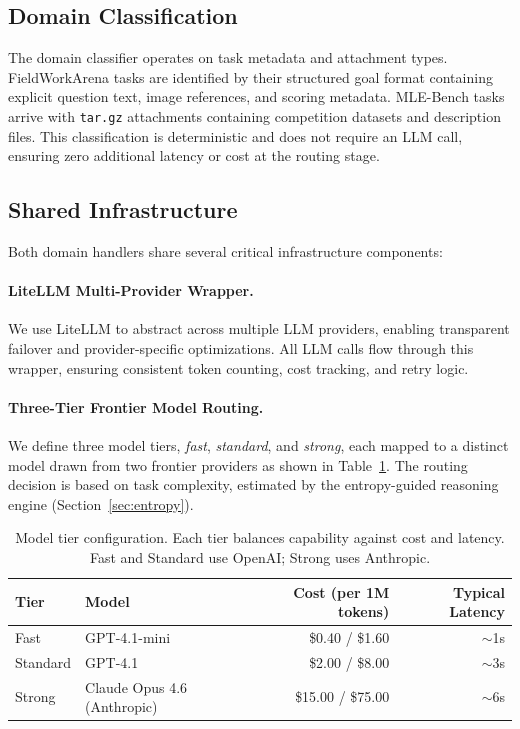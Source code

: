 \documentclass[11pt]{article}
\begin{document}
\subsection{Domain Classification}

The domain classifier operates on task metadata and attachment types. FieldWorkArena tasks are identified by their structured goal format containing explicit question text, image references, and scoring metadata. MLE-Bench tasks arrive with \texttt{tar.gz} attachments containing competition datasets and description files. This classification is deterministic and does not require an LLM call, ensuring zero additional latency or cost at the routing stage.

\subsection{Shared Infrastructure}

Both domain handlers share several critical infrastructure components:

\paragraph{LiteLLM Multi-Provider Wrapper.} We use LiteLLM \citep{litellm2024} to abstract across multiple LLM providers, enabling transparent failover and provider-specific optimizations. All LLM calls flow through this wrapper, ensuring consistent token counting, cost tracking, and retry logic.

\paragraph{Three-Tier Frontier Model Routing.} We define three model tiers, \emph{fast}, \emph{standard}, and \emph{strong}, each mapped to a distinct model drawn from two frontier providers as shown in Table~\ref{tab:model_tiers}. The routing decision is based on task complexity, estimated by the entropy-guided reasoning engine (Section~\ref{sec:entropy}).

\begin{table}[t]
\centering
\caption{Model tier configuration. Each tier balances capability against cost and latency. Fast and Standard use OpenAI; Strong uses Anthropic.}
\label{tab:model_tiers}
\begin{tabular}{@{}llrr@{}}
\toprule
\textbf{Tier} & \textbf{Model} & \textbf{Cost (per 1M tokens)} & \textbf{Typical Latency} \\
\midrule
Fast     & GPT-4.1-mini            & \$0.40 / \$1.60   & $\sim$1s \\
Standard & GPT-4.1                 & \$2.00 / \$8.00   & $\sim$3s \\
Strong   & Claude Opus 4.6 (Anthropic) & \$15.00 / \$75.00  & $\sim$6s \\
\bottomrule
\end{tabular}
\end{table}
\end{document}
